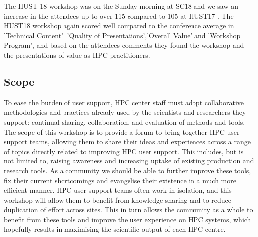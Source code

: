 \documentclass[a4paper,10pt]{article}
\begin{document}
The HUST-18 workshop was on the Sunday morning at SC18 and we saw an increase in the 
attendees up to over 115 compared to 105 at HUST17 .  The HUST18 workshop again scored well 
compared to the conference average in 'Technical Content', 'Quality of Presentations','Overall Value' 
and 'Workshop Program', and based on the attendees comments they found the workshop and the 
presentations of value as HPC practitioners. 

\subsection*{Scope}
\label{sec:scope}

To ease the burden of user support, HPC center staff must adopt collaborative
methodologies and practices already used by the scientists and researchers
they support: continual sharing, collaboration, and evaluation of methods and tools.
The scope of this workshop is to provide a forum to bring together HPC user support
teams, allowing them to share their ideas and experiences across a range of topics
directly related to improving HPC user support. This includes, but is not limited to, 
raising awareness and increasing uptake of existing production and research tools.
As a community we should be able to further improve these tools, fix their current
shortcomings and evangelise their existence in a much more efficient manner. HPC user 
support teams often work in isolation, and this workshop will allow them to benefit 
from knowledge sharing and to reduce duplication of effort across sites.
This in turn allows the community as a whole to benefit from these tools and improve
the user experience on HPC systems, which hopefully results in maximising the 
scientific output of each HPC centre.
\end{document}
